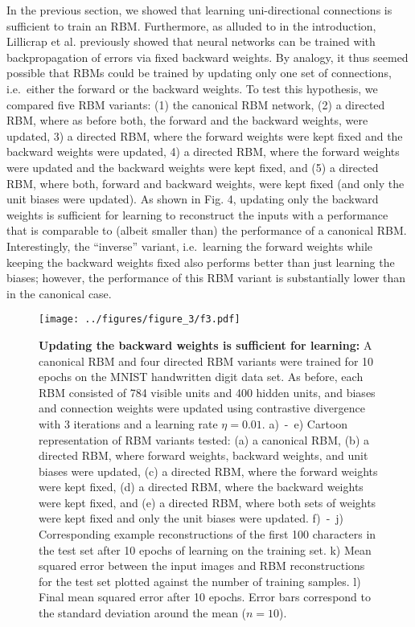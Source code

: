 \documentclass[11pt]{article}
\begin{document}
In the previous section, we showed that learning uni-directional
connections is sufficient to train an RBM. Furthermore, as alluded to
in the introduction, Lillicrap et al. previously showed that neural
networks can be trained with backpropagation of errors via fixed
backward weights. By analogy, it thus seemed possible that RBMs could
be trained by updating only one set of connections, i.e.\ either the
forward or the backward weights. To test this hypothesis, we compared
five RBM variants: (1) the canonical RBM network, (2) a directed RBM,
where as before both, the forward and the backward weights, were
updated, 3) a directed RBM, where the forward weights were kept fixed
and the backward weights were updated, 4) a directed RBM, where the
forward weights were updated and the backward weights were kept fixed,
and (5) a directed RBM, where both, forward and backward weights, were
kept fixed (and only the unit biases were updated). As shown in
Fig. 4, updating only the backward weights is sufficient for learning
to reconstruct the inputs with a performance that is comparable to
(albeit smaller than) the performance of a canonical
RBM. Interestingly, the ``inverse'' variant, i.e.\ learning the forward
weights while keeping the backward weights fixed also performs better
than just learning the biases; however, the performance of this RBM
variant is substantially lower than in the canonical case.

\begin{figure}[H]
  \label{fig:backward_rbm}
  \centering
  \texttt{[image: ../figures/figure\_3/f3.pdf]}
  \caption{\footnotesize
    \textbf{Updating the backward weights is sufficient for learning:}
    A canonical RBM and four directed RBM variants were trained for 10 epochs on the MNIST handwritten digit data set.
    As before, each RBM consisted of 784 visible units and 400 hidden
    units, and biases and connection weights were updated using contrastive
    divergence with 3 iterations and a learning rate $\eta=0.01$.
    a)~-~e) Cartoon representation of RBM variants tested:
    (a) a canonical RBM,
    (b) a directed RBM, where forward weights, backward weights, and unit biases were updated,
    (c) a directed RBM, where the forward weights were kept fixed,
    (d) a directed RBM, where the backward weights were kept fixed, and
    (e) a directed RBM, where both sets of weights were kept fixed and only the unit biases were updated.
    f)~-~j) Corresponding example reconstructions of the first 100 characters in the test set after 10 epochs of learning on the training set.
    k) Mean squared error between the input images and RBM reconstructions for the test set plotted against the number of training samples.
    l) Final mean squared error after 10 epochs. Error bars correspond to the standard deviation around the mean ($n = 10$).
  }
\end{figure}
\end{document}
